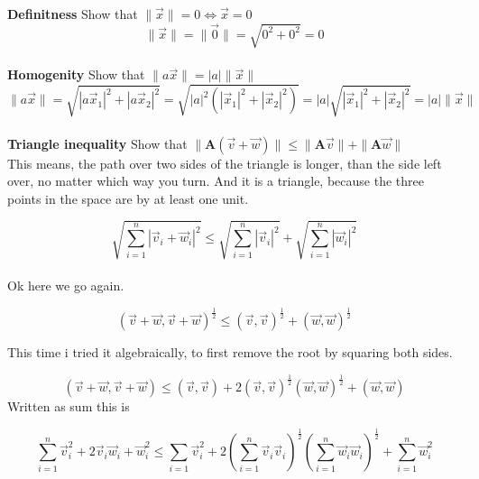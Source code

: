 \documentclass[a4paper]{article}
\begin{document}
\begin{Example}
\textbf{Definitness} Show that $\|\vec{x}\| = 0 \iff \vec{x} = 0$\\

\begin{displaymath}
    \|\vec{x}\| = \|\vec{0}\| = \sqrt{0^{2} + 0^{2}} = 0
\end{displaymath}\\

\textbf{Homogenity} Show that $\|a\vec{x}\| = |a|\|\vec{x}\|$\\

\begin{displaymath}
    \|a\vec{x}\| = \sqrt{|a\vec{x}_1|^{2} + |a\vec{x}_2|^{2}} = \sqrt{|a|^{2}(|\vec{x}_1|^{2} + |\vec{x}_2|^{2})} = |a|\sqrt{|\vec{x}_1|^{2} + |\vec{x}_2|^{2}} = |a|\|\vec{x}\|
\end{displaymath}\\

\textbf{Triangle inequality} Show that $ \|\boldsymbol{A}(\vec{v} + \vec{w})\| \leq \|\boldsymbol{A}\vec{v}\| + \|\boldsymbol{A}\vec{w}\|$\\

This means, the path over two sides of the triangle is longer, than the side left over, no matter which way you turn. And it is a triangle, because the three points in the space are by at least one unit.

\begin{displaymath}
    \sqrt{\sum_{i=1}^{n}|\vec{v}_{i} + \vec{w}_{i}|^{2}} \leq \sqrt{\sum_{i=1}^{n}|\vec{v}_{i}|^{2}} + \sqrt{\sum_{i=1}^{n}|\vec{w}_{i}|^{2}} 
\end{displaymath}\\

Ok here we go again.

\begin{displaymath}
(\vec{v}+\vec{w}, \vec{v}+\vec{w})^{\frac{1}{2}} \leq (\vec{v},\vec{v})^{\frac{1}{2}}+(\vec{w},\vec{w})^{\frac{1}{2}}
\end{displaymath}

 This time i tried it algebraically, to first remove the root by squaring both sides. 

\begin{displaymath}
(\vec{v}+\vec{w}, \vec{v}+\vec{w}) \leq (\vec{v},\vec{v}) + 2(\vec{v},\vec{v})^{\frac{1}{2}}(\vec{w},\vec{w})^{\frac{1}{2}} + (\vec{w},\vec{w})
\end{displaymath}
Written as sum this is

\begin{displaymath}
\sum_{i=1}^{n}\vec{v}_{i}^{2}+2\vec{v}_{i}\vec{w}_{i}+\vec{w}_{i}^{2} \leq \sum_{i=1}\vec{v}_{i}^{2}+2(\sum_{i=1}^{n}\vec{v}_{i}\vec{v}_{i})^{\frac{1}{2}}(\sum_{i=1}^{n}\vec{w}_{i}\vec{w}_{i})^{\frac{1}{2}}+\sum_{i=1}^{n}\vec{w}_{i}^{2}
\end{displaymath}


\end{Example}
\end{document}
